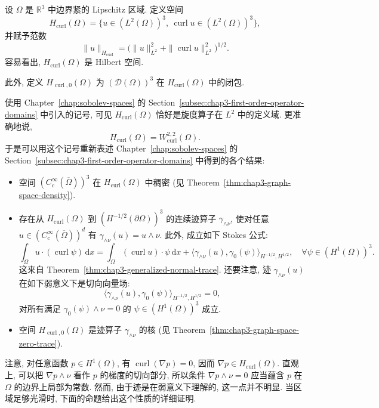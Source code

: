 \begin{Definition}
\label{def:chap4-hcurl-space}
设 $\Omega$ 是 $\mathbb R^3$ 中边界紧的 Lipschitz 区域. 定义空间
\[
 H_{\operatorname{curl}}(\Omega)
 =\{u\in(L^2(\Omega))^3,\ \operatorname{curl}u\in(L^2(\Omega))^3\},
\]
并赋予范数
\[
 \|u\|_{H_{\operatorname{curl}}}
 =\bigl(\|u\|_{L^2}^2+\|\operatorname{curl}u\|_{L^2}^2\bigr)^{1/2}.
\]
容易看出, $H_{\operatorname{curl}}(\Omega)$ 是 Hilbert 空间.

此外, 定义 $H_{\operatorname{curl},0}(\Omega)$ 为 $(\mathcal D(\Omega))^3$ 在 $H_{\operatorname{curl}}(\Omega)$ 中的闭包.
\end{Definition}

使用 Chapter~\ref{chap:sobolev-spaces} 的 Section~\ref{subsec:chap3-first-order-operator-domains} 中引入的记号, 可见 $H_{\operatorname{curl}}(\Omega)$ 恰好是旋度算子在 $L^2$ 中的定义域. 更准确地说,
\[
 H_{\operatorname{curl}}(\Omega)=W_{\operatorname{curl}}^{2,2}(\Omega).
\]
于是可以用这个记号重新表述 Chapter~\ref{chap:sobolev-spaces} 的 Section~\ref{subsec:chap3-first-order-operator-domains} 中得到的各个结果:
\begin{itemize}
 \item 空间 $(C_c^\infty(\overline\Omega))^3$ 在 $H_{\operatorname{curl}}(\Omega)$ 中稠密 (见 Theorem~\ref{thm:chap3-graph-space-density}).
 \item 存在从 $H_{\operatorname{curl}}(\Omega)$ 到 $(H^{-1/2}(\partial\Omega))^3$ 的连续迹算子 $\gamma_{\wedge\nu}$, 使对任意 $u\in(C_c^\infty(\overline\Omega))^d$ 有 $\gamma_{\wedge\nu}(u)=u\wedge\nu$. 此外, 成立如下 Stokes 公式:
 \begin{equation}
  \int_\Omega u\cdot(\operatorname{curl}\psi)\,\mathrm dx
  =\int_\Omega(\operatorname{curl}u)\cdot\psi\,\mathrm dx
  +\langle\gamma_{\wedge\nu}(u),\gamma_0(\psi)\rangle_{H^{-1/2},H^{1/2}},
  \quad\forall\psi\in(H^1(\Omega))^3.
  \label{eq:chap4-hcurl-stokes-formula}
 \end{equation}
 这来自 Theorem~\ref{thm:chap3-generalized-normal-trace}. 还要注意, 迹 $\gamma_{\wedge\nu}(u)$ 在如下弱意义下是切向向量场:
 \[
  \langle\gamma_{\wedge\nu}(u),\gamma_0(\psi)\rangle_{H^{-1/2},H^{1/2}}=0,
 \]
对所有满足 $\gamma_0(\psi)\wedge\nu=0$ 的 $\psi\in(H^1(\Omega))^3$ 成立.
 \item 空间 $H_{\operatorname{curl},0}(\Omega)$ 是迹算子 $\gamma_{\wedge\nu}$ 的核 (见 Theorem~\ref{thm:chap3-graph-space-zero-trace}).
\end{itemize}

注意, 对任意函数 $p\in H^1(\Omega)$, 有 $\operatorname{curl}(\nabla p)=0$, 因而 $\nabla p\in H_{\operatorname{curl}}(\Omega)$. 直观上, 可以把 $\nabla p\wedge\nu$ 看作 $p$ 的梯度的切向部分, 所以条件 $\nabla p\wedge\nu=0$ 应当蕴含 $p$ 在 $\Omega$ 的边界上局部为常数. 然而, 由于迹是在弱意义下理解的, 这一点并不明显. 当区域足够光滑时, 下面的命题给出这个性质的详细证明.

